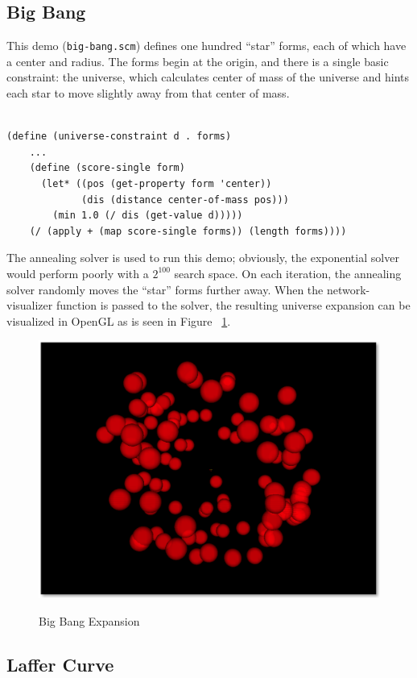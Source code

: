\documentclass[12pt,a4paper]{article}
\begin{document}
\subsection{Big Bang}

This demo (\texttt{big-bang.scm}) defines one hundred ``star'' forms, each of which have a center and radius. The forms begin at the origin, and there is a single basic constraint: the universe, which calculates center of mass of the universe and hints each star to move slightly away from that center of mass. 
\begin{lstlisting}

(define (universe-constraint d . forms)
    ...
    (define (score-single form)
      (let* ((pos (get-property form 'center))
             (dis (distance center-of-mass pos)))
        (min 1.0 (/ dis (get-value d)))))
    (/ (apply + (map score-single forms)) (length forms))))
\end{lstlisting}

The annealing solver is used to run this demo; obviously, the exponential solver would perform poorly with a $2^{100}$ search space. On each iteration, the annealing solver randomly moves the ``star'' forms further away. When the network-visualizer function is passed to the solver, the resulting universe expansion can be visualized in OpenGL as is seen in Figure ~\ref{fig:bigbang}.
\begin{figure}[H]
\caption{Big Bang Expansion}
\centering
\includegraphics[scale=.5]{bigbang.png}
\label{fig:bigbang}
\end{figure}

\subsection{Laffer Curve}
\end{document}
